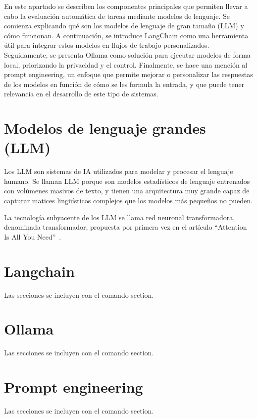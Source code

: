
En este apartado se describen los componentes principales que permiten llevar 
a cabo la evaluación automática de tareas mediante modelos de lenguaje. 
Se comienza explicando qué son los modelos de lenguaje de gran tamaño (LLM) 
y cómo funcionan. A continuación, se introduce LangChain como una herramienta 
útil para integrar estos modelos en flujos de trabajo personalizados. 
Seguidamente, se presenta Ollama como solución para ejecutar modelos de forma 
local, priorizando la privacidad y el control. Finalmente, se hace una mención 
al prompt engineering, un enfoque que permite mejorar o personalizar las 
respuestas de los modelos en función de cómo se les formula la entrada, y 
que puede tener relevancia en el desarrollo de este tipo de sistemas.

\section{Modelos de lenguaje grandes (LLM)}

Los LLM son sistemas de IA utilizados para modelar y procesar el lenguaje humano.
Se llaman LLM porque son modelos estadísticos de lenguaje entrenados con volúmenes 
masivos de texto, y tienen una arquitectura muy grande capaz de capturar matices 
lingüísticos complejos que los modelos más pequeños no pueden.

La tecnología subyacente de los LLM se llama red neuronal transformadora, denominada 
transformador, propuesta por primera vez en el artículo ``Attention Is All You Need''~\cite{vaswani2017}.

\section{Langchain }

Las secciones se incluyen con el comando section.

\section{Ollama}

Las secciones se incluyen con el comando section.

\section{Prompt engineering}

Las secciones se incluyen con el comando section.

